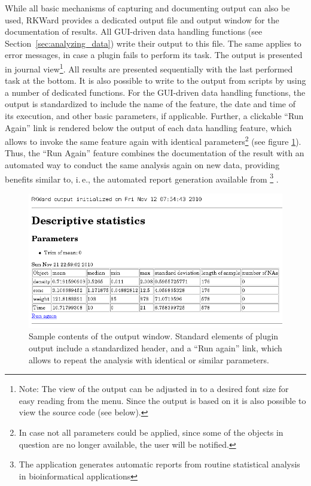 While all basic mechanisms of
capturing and documenting  output can also
be used, RKWard provides a dedicated output file and output
window for the documentation of results. All GUI-driven data handling
functions (see Section~\ref{sec:analyzing_data}) write their output to this file. 
The same applies to error messages, in case a plugin fails to perform its task.
The output is presented in journal view\footnote{Note: The view of the output can be adjusted in
to a desired font size for easy reading from the menu. 
Since the output is based on  it is also possible to view the source code 
(see below).}. All results are presented
sequentially with the last performed task at the bottom.
It is also possible to write to the output from 
scripts by using a number of dedicated 
functions. For the GUI-driven data handling functions, the output is
standardized to include the name of the feature, the date and time of
its execution, and other basic parameters, if
applicable. Further, a clickable ``Run
Again'' link is rendered below the output of each data
handling feature, which allows to invoke the same feature again with
identical parameters\footnote{In case not all parameters could be
applied, since some of the  objects in
question are no longer available, the user will be notified.} (see
figure \ref{fig:results_output}). Thus, the ``Run
Again'' feature combines the documentation of the result
with an automated way to conduct the same analysis again on new
data, providing benefits similar to, i.\,e., the automated report generation
available from \footnote{The application generates automatic
reports from routine statistical analysis in bioinformatical
applications} \citep{RaffelsbergerW2008}.

\begin{figure}[htp]
 \centering
 \includegraphics[width=15.5cm]{../figures/results_output_cropped.png}
 \caption{Sample contents of the output window. Standard elements of plugin output include
 a standardized header, and a ``Run again'' link, which allows to repeat the analysis with
 identical or similar parameters.}
 \label{fig:results_output}
\end{figure}

